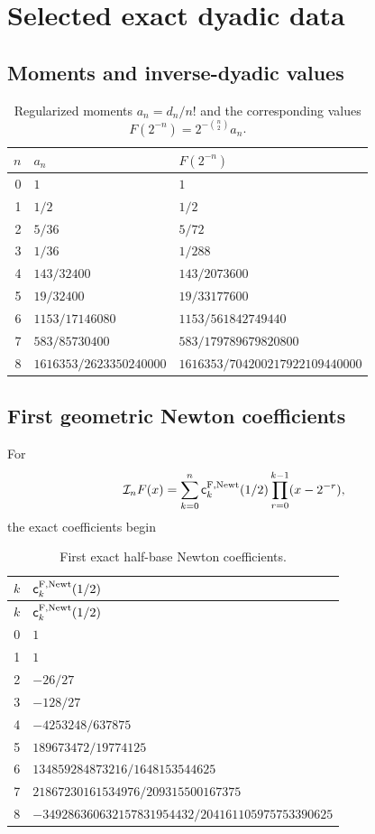 \section{Selected exact dyadic data}
\label{gq:app:exact-data}

\subsection{Moments and inverse-dyadic values}

\begin{table}[htbp]
\centering
\caption{Regularized moments $a_n=d_n/n!$ and the corresponding values
$F(2^{-n})=2^{-\binom n2}a_n$.}
\label{gq:tab:exact-fabius-data}
\small
\begin{tabular}{@{}rll@{}}
\toprule
$n$ & $a_n$ & $F(2^{-n})$\\
\midrule
0 & $1$ & $1$\\
1 & $1/2$ & $1/2$\\
2 & $5/36$ & $5/72$\\
3 & $1/36$ & $1/288$\\
4 & $143/32400$ & $143/2073600$\\
5 & $19/32400$ & $19/33177600$\\
6 & $1153/17146080$ & $1153/561842749440$\\
7 & $583/85730400$ & $583/179789679820800$\\
8 & $1616353/2623350240000$
  & $1616353/704200217922109440000$\\
\bottomrule
\end{tabular}
\end{table}

\subsection{First geometric Newton coefficients}

For
\[
 \mathcal I_nF(x)=\sum_{k=0}^n\mathsf{c}^{\mathrm{F,Newt}}_{k}\!\left(1/2\right)
 \prod_{r=0}^{k-1}(x-2^{-r}),
\]
the exact coefficients begin
\begin{longtable}{@{}rl@{}}
\caption{First exact half-base Newton coefficients.}
\label{gq:tab:exact-newton-coefficients}\\
\toprule
$k$ & $\mathsf{c}^{\mathrm{F,Newt}}_{k}\!\left(1/2\right)$\\
\midrule
\endfirsthead
\toprule
$k$ & $\mathsf{c}^{\mathrm{F,Newt}}_{k}\!\left(1/2\right)$\\
\midrule
\endhead
0 & $1$\\
1 & $1$\\
2 & $-26/27$\\
3 & $-128/27$\\
4 & $-4253248/637875$\\
5 & $189673472/19774125$\\
6 & $134859284873216/1648153544625$\\
7 & $21867230161534976/209315500167375$\\
8 & $-349286360632157831954432/204161105975753390625$\\
\bottomrule
\end{longtable}

